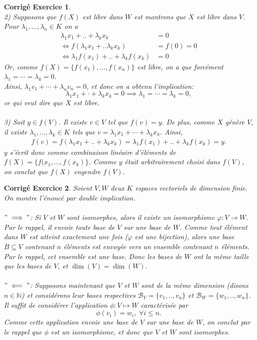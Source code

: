 \documentclass[11pt,french,table]{article}
\theoremstyle{exercice}
\theoremstyle{corrigé}
\newtheorem{corrigé}{Corrigé Exercice}
\begin{document}
\begin{corrigé}
\\
2) Supposons que $f(X)$ est libre dans $W$ est montrons que $X$ est libre dans $V$. \\
Pour $\lambda_1,...,\lambda_n \in K$ on a 
\begin{align*}
	\lambda_1 x_1+..+\lambda_k x_k&=0\\ 
	\iff f(\lambda_1x_1+..\lambda_kx_k)&=f(0)=0\\
	\iff \lambda_1f(x_1)+..+\lambda_kf(x_k)&=0
\end{align*}
Or, comme $f(X) = \{ f(x_1),...,f(x_n) \}$ est libre, on a que forcément $\lambda_1= \cdots =\lambda_k=0$. \\
Ainsi, $\lambda_1 v_1 + \cdots + \lambda_n v_n = 0$, et donc on a obtenu l'implication:
$$\lambda_1 x_1 + \cdot + \lambda_k x_k = 0 \implies \lambda_1 = \cdots = \lambda_k = 0,$$
ce qui veut dire que $X$ est libre. \\
\\
3) Soit $y \in f(V)$. Il existe $v \in V$ tel que $f(v)=y$. De plus, comme $X$ génère $V$, il existe $\lambda_1,...,\lambda_k \in K$ tels que $v=\lambda_1 x_1+ \cdots +\lambda_k x_k$. Ainsi,
\begin{align*}
f(v)=f(\lambda_1 x_1+..+\lambda_k x_k)=\lambda_1 f(x_1)+..+\lambda_k f(x_k)=y.
\end{align*}
$y$ s'écrit donc comme combinaison linéaire d'éléments de $f(X) = \{f(x_1,...,f(x_k) \}$. Comme $y$ était arbitrairement choisi dans $f(V)$, on conclut que $f(X)$ engendre $f(V)$.
\end{corrigé}
\vspace{2em}
\begin{corrigé}
Soient $V,W$ deux $K$ espaces vectoriels de dimension finie. On montre l'énoncé par double implication. \\
\\
\underline{$"\implies"$}: Si $V$ et $W$ sont isomorphes, alors il existe un isomorphisme $\varphi: V \longrightarrow W$. Par le rappel, il envoie toute base de $V$ sur une base de $W$. Comme tout élément dans $W$ est atteint exactement une fois ($\varphi$ est une bijection), alors une base $B \subseteq V$ contenant $n$ éléments est envoyée vers un ensemble contenant $n$ éléments. Par le rappel, cet ensemble est une base. Donc les bases de $W$ ont la même taille que les bases de $V$, et $\dim(V) = \dim(W)$.
\\
\\
\underline{$"\impliedby"$}: Supposons maintenant que $V$ et $W$ sont de la même dimension (disons $n \in \mathbb{N}$) et  considérons leur bases respectives $\mathcal{B}_V=\{v_1,..,v_n\}$ et $\mathcal{B}_W=\{w_1,..,w_n\}$. Il suffit de considérer l'application $\phi:V\mapsto W$ caractérisée par
\[
\phi(v_i)=w_i, \; \forall i \leq n.
\]
Comme cette application envoie une base de $V$ sur une base de $W$, on conclut par le rappel que $\phi$ est un isomorphisme, et donc que $V$ et $W$ sont isomorphes.
\end{corrigé}
\end{document}
